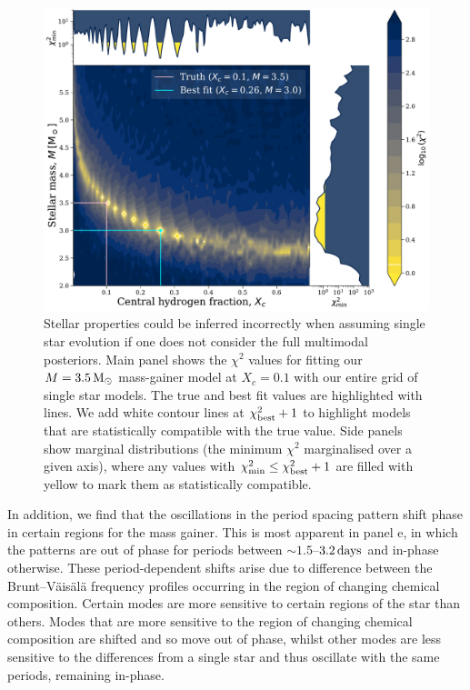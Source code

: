 \documentclass[desactivate]{aa}
\begin{document}
\begin{figure}[tb]
    \centering
    \includegraphics[width=\textwidth]{figures/chi2_xc_0.1.pdf}
    \caption{Stellar properties could be inferred incorrectly when assuming single star evolution if one does not consider the full multimodal posteriors. Main panel shows the $\chi^2$ values for fitting our $M = 3.5 \, {\rm M_\odot}$ mass-gainer model at $X_c = 0.1$ with our entire grid of single star models. The true and best fit values are highlighted with lines. We add white contour lines at $\chi^2_{\rm best} + 1$ to highlight models that are statistically compatible with the true value. Side panels show marginal distributions (the minimum $\chi^2$ marginalised over a given axis), where any values with $\chi^2_{\rm min} \le \chi^2_{\rm best} + 1$ are filled with yellow to mark them as statistically compatible.}
    \label{fig:chi2}
\end{figure}

In addition, we find that the oscillations in the period spacing pattern shift phase in certain regions for the mass gainer. This is most apparent in panel e, in which the patterns are out of phase for periods between ${\sim}1.5$--$3.2 \, {\rm days}$ and in-phase otherwise. These period-dependent shifts arise due to difference between the Brunt–Väisälä frequency profiles occurring in the region of changing chemical composition. Certain modes are more sensitive to certain regions of the star than others. Modes that are more sensitive to the region of changing chemical composition are shifted and so move out of phase, whilst other modes are less sensitive to the differences from a single star and thus oscillate with the same periods, remaining in-phase.
\end{document}
